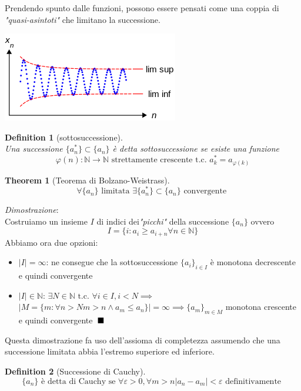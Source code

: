 \documentclass{article}
\newtheorem{theorem}{Theorem}[section]
\newtheorem{definition}{Definition}[section]
\newcommand{\qed}{\rule{0.7em}{0.7em}}
\begin{document}
        Prendendo spunto dalle funzioni, possono essere pensati come una coppia di \textit{"quasi-asintoti"} che limitano la successione.
        \begin{center}
            \includegraphics{limsupinf.png}
        \end{center}
        \begin{definition}[sottosuccessione] \, \\
            Una successione $\{a^*_n\} \subset \{a_n\}$ è detta sottosuccessione se esiste una funzione 
            $$\varphi\left(n\right): \mathbb{N} \to \mathbb{N} \textrm{ strettamente crescente t.c. } a^*_k = a_{\varphi\left(k\right)}$$
        \end{definition}
        \begin{theorem}[Teorema di Bolzano-Weistrass]
            $$\forall \{a_n\} \textrm{ limitata } \exists\{a^*_n\} \subset \{a_n\} \textrm{ convergente }$$
        \end{theorem}
        \textit{Dimostrazione}: \\
            Costruiamo un insieme $I$ di indici dei\textit{"picchi"} della successione $\{a_n\}$ ovvero 
            $$I = \{i: a_i \geq a_{i+n} \forall n \in \mathbb{N}\}$$
            Abbiamo ora due opzioni:
            \begin{itemize}
                \item $|I| = \infty$: ne consegue che la sottosuccessione $\{a_i\}_{i \in I}$ è monotona decrescente e quindi convergente
                \item $|I| \in \mathbb{N}$: $\exists N \in \mathbb{N} \textrm{ t.c. } \forall i \in I, i < N \implies$ \\
                    $|M = \{m: \forall n > N m > n \land a_m \leq a_n\}| = \infty \implies \{a_m\}_{m \in M}$ monotona crescente e quindi convergente $\; \qed$
            \end{itemize}
        Questa dimostrazione fa uso dell'assioma di completezza assumendo che una successione limitata abbia l'estremo superiore ed inferiore.
        \begin{definition}[Successione di Cauchy]
            $$\{a_n\} \textrm{ è detta di Cauchy se } \forall \varepsilon > 0, \forall m > n |a_n - a_m| < \varepsilon \textrm{ definitivamente }$$
        \end{definition}
\end{document}
